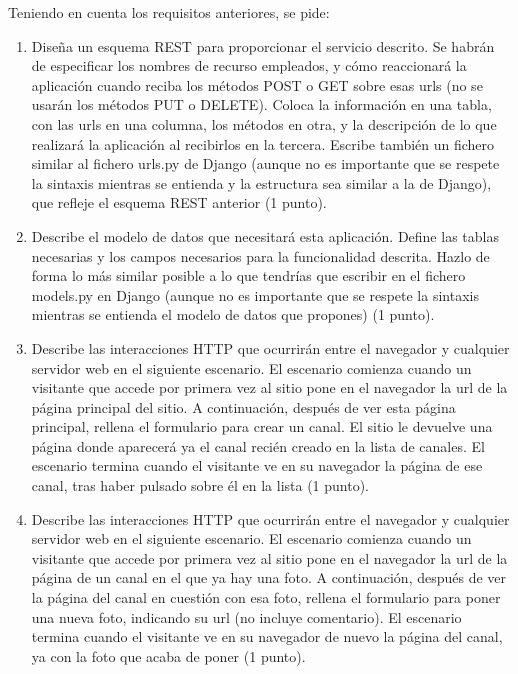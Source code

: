 {Teniendo en cuenta los requisitos anteriores, se pide:

\begin{enumerate}
\item Diseña un esquema REST para proporcionar el servicio descrito. Se habrán de especificar los nombres de recurso empleados, y cómo reaccionará la aplicación cuando reciba los métodos POST o GET sobre esas urls (no se usarán los métodos PUT o DELETE). Coloca la información en una tabla, con las urls en una columna, los métodos en otra, y la descripción de lo que realizará la aplicación al recibirlos en la tercera. Escribe también un fichero similar al fichero urls.py de Django (aunque no es importante que se respete la sintaxis mientras se entienda y la estructura sea similar a la de Django), que refleje el esquema REST anterior (1 punto).

\item Describe el modelo de datos que necesitará esta aplicación. Define las tablas necesarias y los campos necesarios para la funcionalidad descrita. Hazlo de forma lo más similar posible a lo que tendrías que escribir en el fichero models.py en Django (aunque no es importante que se respete la sintaxis mientras se entienda el modelo de datos que propones) (1 punto).

\item Describe las interacciones HTTP que ocurrirán entre el navegador y cualquier servidor web en el siguiente escenario. El escenario comienza cuando un visitante que accede por primera vez al sitio pone en el navegador la url de la página principal del sitio. A continuación, después de ver esta página principal, rellena el formulario para crear un canal. El sitio le devuelve una página donde aparecerá ya el canal recién creado en la lista de canales. El escenario termina cuando el visitante ve en su navegador la página de ese canal, tras haber pulsado sobre él en la lista (1 punto).

\item Describe las interacciones HTTP que ocurrirán entre el navegador y cualquier servidor web en el siguiente escenario. El escenario comienza cuando un visitante que accede por primera vez al sitio pone en el navegador la url de la página de un canal en el que ya hay una foto. A continuación, después de ver la página del canal en cuestión con esa foto, rellena el formulario para poner una nueva foto, indicando su url (no incluye comentario). El escenario termina cuando el visitante ve en su navegador de nuevo la página del canal, ya con la foto que acaba de poner (1 punto).


\end{enumerate}}
